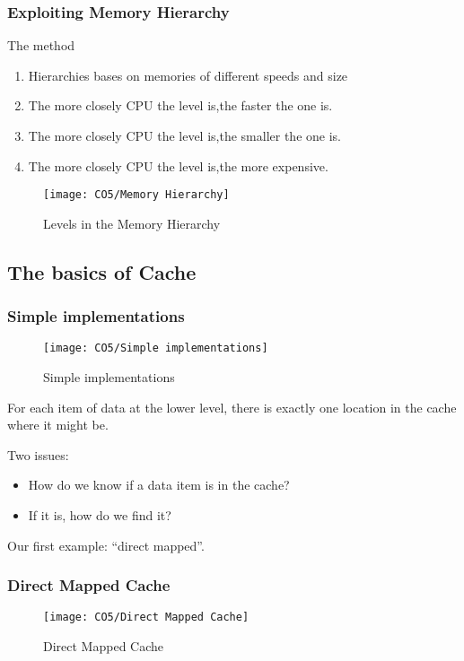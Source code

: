 \subsubsection{Exploiting Memory Hierarchy}
The method
\begin{enumerate}\small
    \item Hierarchies bases on memories of different speeds and size
    \item The more closely CPU the level is,the faster the one is.
    \item The more closely CPU the level is,the smaller the one is.
    \item The more closely CPU the level is,the more expensive. 
\end{enumerate}

\begin{figure}[!htb]
    \centering
    \texttt{[image: CO5/Memory Hierarchy]}
    \caption{Levels in the Memory Hierarchy}
\end{figure}

\subsection{The basics of Cache}
\subsubsection{Simple implementations}

\begin{figure}[!htb]
    \centering
    \texttt{[image: CO5/Simple implementations]}
    \caption{Simple implementations}
\end{figure}

For each item of data at the lower level, there is exactly one location in the cache where it might be.

Two issues:
\begin{itemize}
    \item  How do we know if a data item is in the cache?
    \item  If it is, how do we find it?
\end{itemize}

Our first example: ``direct mapped''. 

\subsubsection{Direct Mapped Cache}
\begin{figure}[!htb]
    \centering
    \texttt{[image: CO5/Direct Mapped Cache]}
    \caption{Direct Mapped Cache}
    \label{Direct Mapped Cache}
\end{figure}

